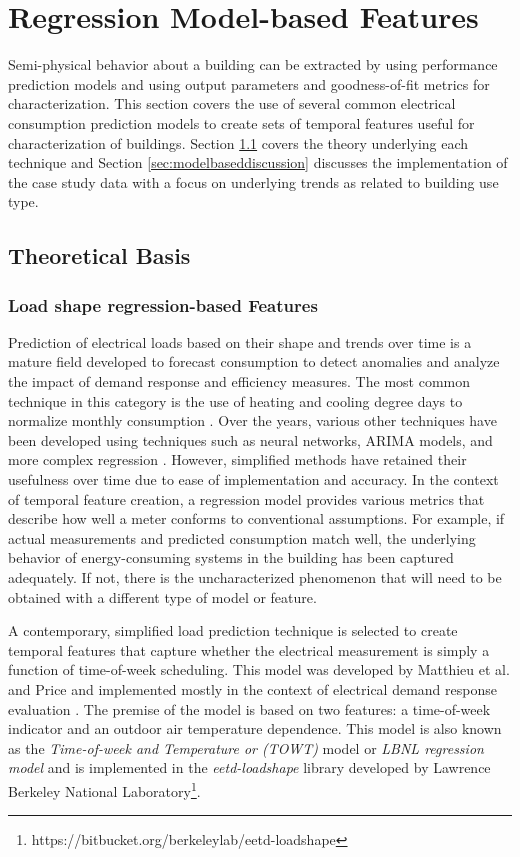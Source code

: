 \chapter{Regression Model-based Features}
\label{sec:regressionmodels}

Semi-physical behavior about a building can be extracted by using performance prediction models and using output parameters and goodness-of-fit metrics for characterization. This section covers the use of several common electrical consumption prediction models to create sets of temporal features useful for characterization of buildings. Section \ref{sec:modelbasedtheory} covers the theory underlying each technique and Section \ref{sec:modelbaseddiscussion} discusses the implementation of the case study data with a focus on underlying trends as related to building use type.

\section{Theoretical Basis}
\label{sec:modelbasedtheory}
\subsection{Load shape regression-based Features}
\label{sec:regressionmetrics}

Prediction of electrical loads based on their shape and trends over time is a mature field developed to forecast consumption to detect anomalies and analyze the impact of demand response and efficiency measures. The most common technique in this category is the use of heating and cooling degree days to normalize monthly consumption \citep{fels_prism:_1986}. Over the years, various other techniques have been developed using techniques such as neural networks, ARIMA models, and more complex regression \citep{taylor_comparison_2006}. However, simplified methods have retained their usefulness over time due to ease of implementation and accuracy. In the context of temporal feature creation, a regression model provides various metrics that describe how well a meter conforms to conventional assumptions. For example, if actual measurements and predicted consumption match well, the underlying behavior of energy-consuming systems in the building has been captured adequately. If not, there is the uncharacterized phenomenon that will need to be obtained with a different type of model or feature. 

A contemporary, simplified load prediction technique is selected to create temporal features that capture whether the electrical measurement is simply a function of time-of-week scheduling. This model was developed by Matthieu et al. and Price and implemented mostly in the context of electrical demand response evaluation \citep{price_methods_2010, mathieu_quantifying_2011}. The premise of the model is based on two features: a time-of-week indicator and an outdoor air temperature dependence. This model is also known as the \emph{Time-of-week and Temperature or (TOWT)} model or \emph{LBNL regression model} and is implemented in the \emph{eetd-loadshape} library developed by Lawrence Berkeley National Laboratory\footnote{https://bitbucket.org/berkeleylab/eetd-loadshape}.

